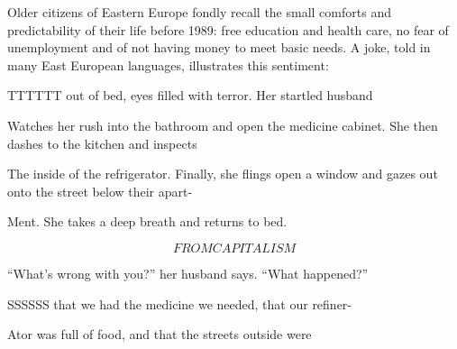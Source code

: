  \par 
Older citizens of Eastern Europe fondly recall the small comforts and predictability of their life before 1989: free education and health care, no fear of unemployment and of not having money to meet basic needs. A joke, told in many East European languages, illustrates this sentiment:
 \par 
TTTTTT out of bed, eyes filled with terror. Her startled husband
 \par 
Watches her rush into the bathroom and open the medicine cabinet. She then dashes to the kitchen and inspects
 \par 
The inside of the refrigerator. Finally, she flings open a window and gazes out onto the street below their apart-
 \par 
Ment. She takes a deep breath and returns to bed.
 \par 
\[FROM CAPITALISM\]
 \par 
“What’s wrong with you?” her husband says. “What happened?”
 \par 
SSSSSS that we had the medicine we needed, that our refiner-
 \par 
Ator was full of food, and that the streets outside were
 \par 
